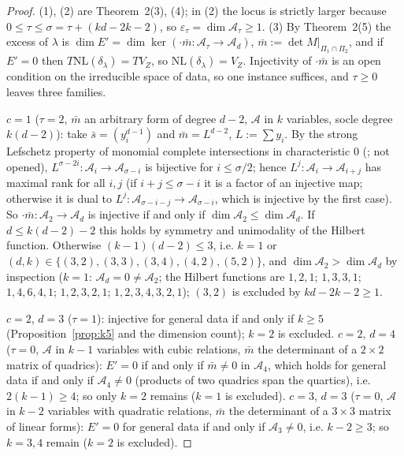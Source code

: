 \documentclass[11pt]{article}
\numberwithin{equation}{section}
\theoremstyle{remark}
\newcommand{\NL}{\mathrm{NL}}
\newcommand{\VZ}{V_Z}
\newcommand{\cA}{\mathcal{A}}
\newcommand{\et}{\varepsilon_\tau}
\begin{document}
\begin{proof}
(1), (2) are Theorem~2(3), (4); in (2) the locus is strictly larger because $0\le\tau\le\sigma=\tau+(kd-2k-2)$,
so $\et=\dim\cA_\tau\ge1$. (3) By Theorem~2(5) the excess of $\lambda$ is
$\dim E'=\dim\ker(\cdot\bar m\colon\cA_\tau\to\cA_d)$, $\bar m:=\det M|_{\Pi_1\cap\Pi_2}$, and if $E'=0$ then
$T\NL(\delta_\lambda)=T\VZ$, so $\NL(\delta_\lambda)=\VZ$. Injectivity of $\cdot\bar m$ is an open condition on the
irreducible space of data, so one instance suffices, and $\tau\ge0$ leaves three families.

$c=1$ ($\tau=2$, $\bar m$ an arbitrary form of degree $d-2$, $\cA$ in $k$ variables, socle degree $k(d-2)$): take
$\bar s=(y_i^{d-1})$ and $\bar m=L^{d-2}$, $L:=\sum y_i$. By the strong Lefschetz property of monomial complete
intersections in characteristic $0$ (\cite{St,Wa}; not opened), $L^{\sigma-2i}\colon\cA_i\to\cA_{\sigma-i}$ is
bijective for $i\le\sigma/2$; hence $L^j\colon\cA_i\to\cA_{i+j}$ has maximal rank for all $i,j$ (if
$i+j\le\sigma-i$ it is a factor of an injective map; otherwise it is dual to
$L^j\colon\cA_{\sigma-i-j}\to\cA_{\sigma-i}$, which is injective by the first case). So $\cdot\bar m\colon\cA_2\to\cA_d$
is injective if and only if $\dim\cA_2\le\dim\cA_d$. If $d\le k(d-2)-2$ this holds by symmetry and unimodality of
the Hilbert function. Otherwise $(k-1)(d-2)\le3$, i.e. $k=1$ or
$(d,k)\in\{(3,2),(3,3),(3,4),(4,2),(5,2)\}$, and $\dim\cA_2>\dim\cA_d$ by inspection ($k=1$: $\cA_d=0\ne\cA_2$; the
Hilbert functions are $1,2,1$; $1,3,3,1$; $1,4,6,4,1$; $1,2,3,2,1$; $1,2,3,4,3,2,1$); $(3,2)$ is excluded by
$kd-2k-2\ge1$.

$c=2$, $d=3$ ($\tau=1$): injective for general data if and only if $k\ge5$ (Proposition~\ref{prop:k5} and the
dimension count); $k=2$ is excluded.
$c=2$, $d=4$ ($\tau=0$, $\cA$ in $k-1$ variables with cubic relations, $\bar m$ the determinant of a $2\times2$ matrix
of quadrics): $E'=0$ if and only if $\bar m\ne0$ in $\cA_4$, which holds for general data if and only if
$\cA_4\ne0$ (products of two quadrics span the quartics), i.e. $2(k-1)\ge4$; so only $k=2$ remains ($k=1$ is
excluded).
$c=3$, $d=3$ ($\tau=0$, $\cA$ in $k-2$ variables with quadratic relations, $\bar m$ the determinant of a $3\times3$
matrix of linear forms): $E'=0$ for general data if and only if $\cA_3\ne0$, i.e. $k-2\ge3$; so $k=3,4$ remain
($k=2$ is excluded).


\end{proof}
\end{document}
